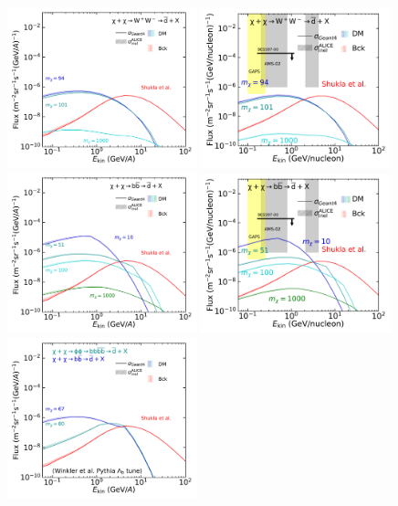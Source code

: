 \begin{figure}[hbtp]
    \centering
    \includegraphics[width=0.49\textwidth]{figures/antideuteron_LIS_WW.pdf}
    \includegraphics[width=0.49\textwidth]{figures/antideuteron_TOA_WW.pdf}
    \includegraphics[width=0.49\textwidth]{figures/antideuteron_LIS_bb.pdf}
    \includegraphics[width=0.49\textwidth]{figures/antideuteron_TOA_bb.pdf}
    \includegraphics[width=0.49\textwidth]{figures/antideuteron_lambdaB_LIS.pdf}

\end{figure}
